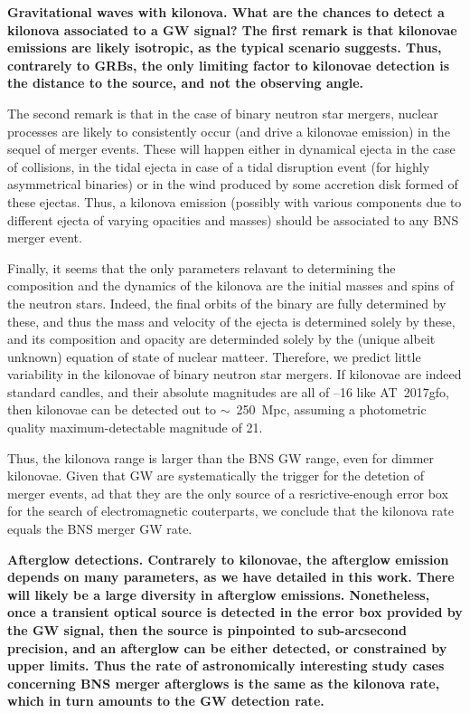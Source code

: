 \bf{Gravitational waves with kilonova. }What are the chances to detect a kilonova associated to a GW signal? The first remark is that kilonovae emissions are likely isotropic, as the typical scenario suggests. Thus, contrarely to GRBs, the only limiting factor to kilonovae detection is the distance to the source, and not the observing angle.

The second remark is that in the case of binary neutron star mergers, nuclear processes are likely to consistently occur (and drive a kilonovae emission) in the sequel of merger events. These will happen either in dynamical ejecta in the case of collisions, in the tidal ejecta in case of a tidal disruption event (for highly asymmetrical binaries) or in the wind produced by some accretion disk formed of these ejectas. Thus, a kilonova emission (possibly with various components due to different ejecta of varying opacities and masses) should be associated to any BNS merger event.

Finally, it seems that the only parameters relavant to determining the composition and the dynamics of the kilonova are the initial masses and spins of the neutron stars. Indeed, the final orbits of the binary are fully determined by these, and thus the mass and velocity of the ejecta is determined solely by these, and its composition and opacity are determinded solely by the (unique albeit unknown) equation of state of nuclear matteer. Therefore, we predict little variability in the kilonovae of binary neutron star mergers. If kilonovae are indeed standard candles, and their absolute magnitudes are all of --16 like AT~2017gfo, then kilonovae can be detected out to $\sim$~250~Mpc, assuming a photometric quality maximum-detectable magnitude of 21.

Thus, the kilonova range is larger than the BNS GW range, even for dimmer kilonovae. Given that GW are systematically the trigger for the detetion of merger events, ad that they are the only source of a resrictive-enough error box for the search of electromagnetic couterparts, we conclude that the kilonova rate equals the BNS merger GW rate.

\bf{Afterglow detections. }Contrarely to kilonovae, the afterglow emission depends on many parameters, as we have detailed in this work. There will likely be a large diversity in afterglow emissions. Nonetheless, once a transient optical source is detected in the error box provided by the GW signal, then the source is pinpointed to sub-arcsecond precision, and an afterglow can be either detected, or constrained by upper limits. Thus the rate of astronomically interesting study cases concerning BNS merger afterglows is the same as the kilonova rate, which in turn amounts to the GW detection rate.


